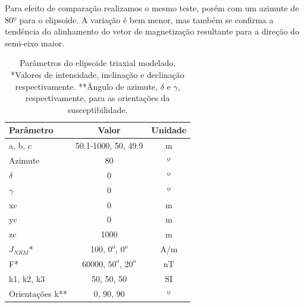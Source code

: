 Para efeito de comparação realizamos o mesmo teste, porém com um azimute de 80$º$ para o elipsoide. A variação é bem menor, mas também se confirma a tendência do alinhamento do vetor de magnetização resultante para a direção do semi-eixo maior.

\vspace{4cm}

\begin{table}[h!]
	\begin{center}
		\begin{tabular}{|l|c|c|}
			\hline
			\textbf{Parâmetro}  & \textbf{Valor}  & \textbf{Unidade} \\
			\hline 
			a, b, c & 50.1-1000, 50, 49.9 & m\\
			\hline
			Azimute   & $80$ & º\\
			\hline
			$\delta$    & $0$ & º\\
			\hline
			$\gamma$   & $0$  & º\\
			\hline
			xc   & 0  & m\\
			\hline          
			yc   & 0  & m\\
			\hline                
			zc   & 1000  & m\\
			\hline
			$J_{NRM}$*  & 100, $0^o$, $0^o$  & A/m\\
			\hline
			F*    & 60000, $50^o$, $20^o$ & nT\\
			\hline
			k1, k2, k3   & 50, 50, 50  & SI\\
			\hline
			Orientações k**   & $0$, $90$, $90$  & º\\
			\hline
		\end{tabular}
		\caption{Parâmetros do elipsoide triaxial modelado. *Valores de intensidade, inclinação e declinação respectivamente. **Ângulo de azimute, $\delta$ e $\gamma$, respectivamente, para as orientações da susceptibilidade.}
	\end{center}
	\label{tab:ellipsoid_shape_iso80}
\end{table}

